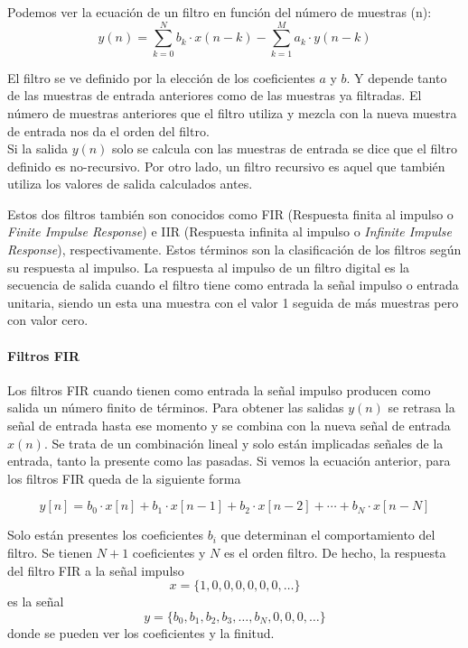 Podemos ver la ecuación de un filtro  en función del número de muestras (n):
$$y(n)= {\sum_{k=0}^N} b_k \cdot x(n-k) - {\sum_{k=1}^M} a_k \cdot y(n-k)$$ \label{eq:filterEq} 

El filtro se ve definido por la elección de los coeficientes $a$ y $b$. Y depende tanto de las muestras de entrada anteriores como de las muestras ya filtradas. El número de muestras anteriores que el filtro utiliza y mezcla con la nueva muestra de entrada nos da el orden del filtro. \\

Si la salida $y(n)$  solo se calcula con las muestras de entrada se dice que el filtro definido es no-recursivo. Por otro lado, un filtro recursivo es aquel que también utiliza los valores de salida calculados antes.

Estos dos filtros también son conocidos como FIR (Respuesta finita al impulso o \emph{Finite Impulse Response}) e IIR (Respuesta infinita al impulso o \emph{Infinite Impulse Response}), respectivamente.
Estos términos son la clasificación de los filtros según su respuesta al impulso. La respuesta al impulso de un filtro digital es la secuencia de salida cuando el filtro tiene como entrada la señal impulso o entrada unitaria, siendo un esta una muestra con el valor 1 seguida de más muestras pero con valor cero. \cite{ref1} %

\paragraph{Filtros FIR}

Los filtros FIR cuando tienen como entrada la señal impulso producen como salida un número finito de términos. Para obtener las salidas $y(n)$ se retrasa la señal de entrada hasta ese momento y se combina con la nueva señal de entrada $x(n)$. Se trata de un combinación lineal y solo están implicadas señales de la entrada, tanto la presente como las pasadas.
Si vemos la ecuación anterior, para los filtros FIR queda de la siguiente forma

$$ y[n] = b_0 \cdot x[n] + b_1 \cdot x[n - 1] + b_2 \cdot x[n - 2] + \cdots + b_N \cdot x[n - N] $$

Solo están presentes los coeficientes $b_i$ que determinan el comportamiento del filtro. Se tienen $N+1$ coeficientes y $N$ es el orden filtro. De hecho, la respuesta del filtro FIR a la señal impulso 
$$ x = \{1, 0, 0, 0, 0, 0, 0, \ldots \} $$
es la señal
$$ y = \{b_0, b_1, b_2, b_3, \ldots, b_N , 0, 0, 0, \ldots \}  $$
donde se pueden ver los coeficientes y la finitud.

